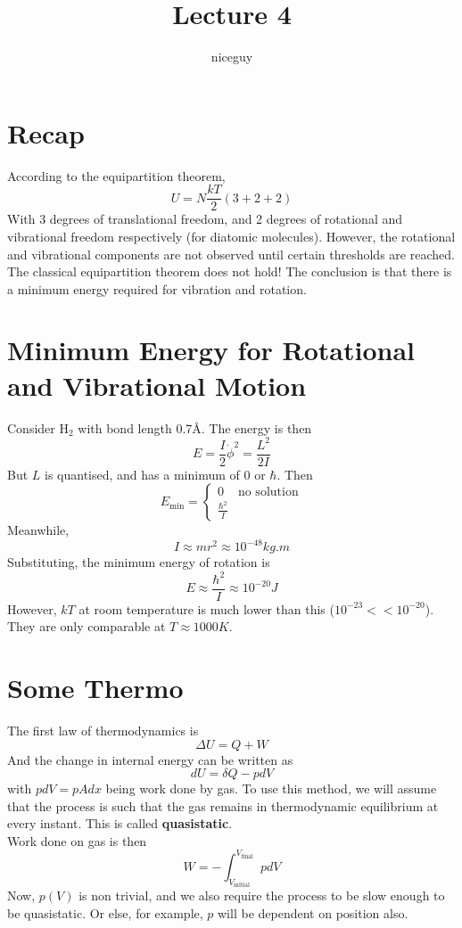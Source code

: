 \documentclass[12pt]{article}
\author{niceguy}
\title{Lecture 4}
\begin{document}
\maketitle

\section{Recap}

According to the equipartition theorem,
$$U = N\frac{kT}{2}(3+2+2)$$
With 3 degrees of translational freedom, and 2 degrees of rotational and vibrational freedom respectively (for diatomic molecules). However, the rotational and vibrational components are not observed until certain thresholds are reached. The classical equipartition theorem does not hold! The conclusion is that there is a minimum energy required for vibration and rotation.

\section{Minimum Energy for Rotational and Vibrational Motion}

Consider H$_2$ with bond length 0.7\AA. The energy is then
$$E = \frac{I}{2}\dot{\phi}^2 = \frac{L^2}{2I}$$
But $L$ is quantised, and has a minimum of 0 or $\hbar$. Then
$$E_\text{min} = \begin{cases} 0 & \text{no solution} \\ \frac{\hbar^2}{I} & \end{cases}$$
Meanwhile,
$$I \approx mr^2 \approx 10^{-48} \unit{kg.m}$$
Substituting, the minimum energy of rotation is
$$E \approx \frac{\hbar^2}{I} \approx 10^{-20} \unit{J}$$
However, $kT$ at room temperature is much lower than this ($10^{-23} << 10^{-20}$). They are only comparable at $T \approx 1000 \unit{K}$.

\section{Some Thermo}

The first law of thermodynamics is
$$\Delta U = Q + W$$
And the change in internal energy can be written as
$$dU = \delta Q - pdV$$
with $pdV = pAdx$ being work done by gas. To use this method, we will assume that the process is such that the gas remains in thermodynamic equilibrium at every instant. This is called \textbf{quasistatic}. \\
Work done on gas is then
$$W = -\int_{V_\text{initial}}^{V_\text{final}} pdV$$
Now, $p(V)$ is non trivial, and we also require the process to be slow enough to be quasistatic. Or else, for example, $p$ will be dependent on position also.
\end{document}
